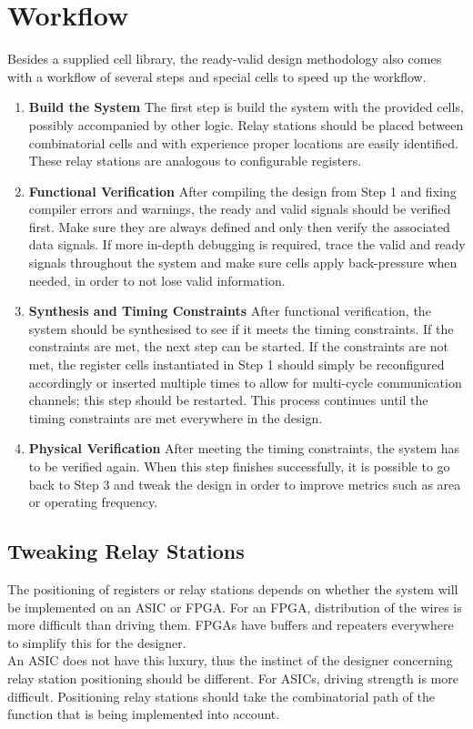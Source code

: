 \section{Workflow}
\label{sec:workflow}
Besides a supplied cell library, the ready-valid design methodology also comes with a workflow of several steps and special cells to speed up the workflow.
\begin{enumerate}
  \item{\textbf{Build the System} The first step is build the system with the provided cells, possibly accompanied by other logic. Relay stations should be placed between combinatorial cells and with experience proper locations are easily identified. These relay stations are analogous to configurable registers.}
  \item{\textbf{Functional Verification} After compiling the design from Step 1 and fixing compiler errors and warnings, the ready and valid signals should be verified first. Make sure they are always defined and only then verify the associated data signals. If more in-depth debugging is required, trace the valid and ready signals throughout the system and make sure cells apply back-pressure when needed, in order to not lose valid information.}
  \item{\textbf{Synthesis and Timing Constraints} After functional verification, the system should be synthesised to see if it meets the timing constraints. If the constraints are met, the next step can be started. If the constraints are not met, the register cells instantiated in Step 1 should simply be reconfigured accordingly or inserted multiple times to allow for multi-cycle communication channels; this step should be restarted. This process continues until the timing constraints are met everywhere in the design.}
  \item{\textbf{Physical Verification} After meeting the timing constraints, the system has to be verified again. When this step finishes successfully, it is possible to go back to Step 3 and tweak the design in order to improve metrics such as area or operating frequency.}
\end{enumerate}



\subsection{Tweaking Relay Stations}
The positioning of registers or relay stations depends on whether the system will be implemented on an ASIC or FPGA. For an FPGA, distribution of the wires is more difficult than driving them. FPGAs have buffers and repeaters everywhere to simplify this for the designer.\\
An ASIC does not have this luxury, thus the instinct of the designer concerning relay station positioning should be different. For ASICs, driving strength is more difficult. Positioning relay stations should take the combinatorial path of the function that is being implemented into account.



